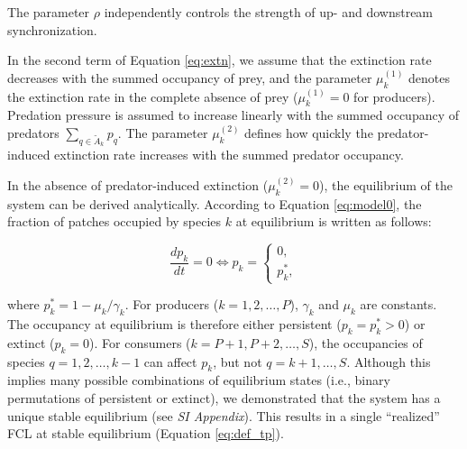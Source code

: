 \documentclass[11pt, class=article, crop=false]{standalone}
\begin{document}
The parameter $\rho$ independently controls the strength of up- and downstream synchronization.

In the second term of Equation \ref{eq:extn}, we assume that the extinction rate decreases with the summed occupancy of prey, and the parameter $\mu_{k}^{(1)}$ denotes the extinction rate in the complete absence of prey ($\mu_{k}^{(1)} = 0$ for producers).
Predation pressure is assumed to increase linearly with the summed occupancy of predators $\sum_{q \in \tilde{A}_{k}} p_{q}$.
The parameter $\mu_{k}^{(2)}$ defines how quickly the predator-induced extinction rate increases with the summed predator occupancy.

In the absence of predator-induced extinction ($\mu_{k}^{(2)}=0$), the equilibrium of the system can be derived analytically.
According to  Equation \ref{eq:model0}, the fraction of patches occupied by species $k$ at equilibrium is written as follows:

\begin{equation}
    \frac{dp_k}{dt} = 0 \Leftrightarrow p_k = \left\{\begin{array}{c}
         0,\\
         p_{k}^{*}, 
    \end{array}
    \right.
\end{equation}

where $p_{k}^{*} = 1 - \mu_k / \gamma_k$. 
For producers ($k=1, 2, \ldots, P$), $\gamma_k$ and $\mu_k$ are constants.
The occupancy at equilibrium is therefore either persistent ($p_k = p_k^* > 0$) or extinct ($p_k = 0$).
For consumers ($k = P+1, P+2, \ldots, S$), the occupancies of species $q = 1, 2, \ldots, k - 1$ can affect $p_k$, but not $q = k + 1, \ldots, S$.
Although this implies many possible combinations of equilibrium states (i.e., binary permutations of persistent or extinct), we demonstrated that the system has a unique stable equilibrium (see \textit{SI Appendix}).
This results in a single ``realized'' FCL at stable equilibrium (Equation \ref{eq:def_tp}).

\end{document}
